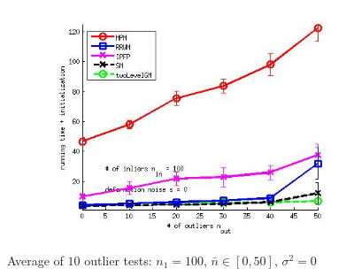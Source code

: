 \begin{figure}[h]
\begin{subfigure}[b]{0.3\textwidth}
		\includegraphics[scale=0.25]{"chapter3/fig/SyntheticTest/ver4.3.2/outliertest_nodeform_n50/time_summary_avg10t"} 
	\end{subfigure} 	
	\caption{Average of $10$ outlier tests: $n_1=100$, $\bar{n}\in[0,50]$, $\sigma^2=0$}
	\label{fig:syntest2_ver432}
\end{figure}
\FloatBarrier	

